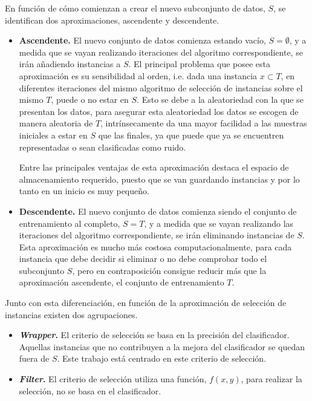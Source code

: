 En función de cómo comienzan a crear el nuevo subconjunto de datos, $S$, se identifican dos aproximaciones, ascendente y descendente.
\begin{itemize}
\item \textbf{Ascendente.} El nuevo conjunto de datos comienza estando vacío, $S = \emptyset$, y a medida que se vayan realizando iteraciones del algoritmo correspondiente, se irán añadiendo instancias a $S$. El principal problema que posee esta aproximación es su sensibilidad al orden, i.e. dada una instancia $x \subset T$, en diferentes iteraciones del mismo algoritmo de selección de instancias sobre el mismo $T$, puede o no estar en $S$. Esto se debe a la aleatoriedad con la que se presentan los datos, para asegurar esta aleatoriedad los datos se escogen de manera aleatoria de $T$, intrínsecamente da una mayor facilidad a las muestras iniciales a estar en $S$ que las finales, ya que puede que ya se encuentren representadas o sean clasificadas como ruido.

Entre las principales ventajas de esta aproximación destaca el espacio de almacenamiento requerido, puesto que se van guardando instancias y por lo tanto en un inicio es muy pequeño.

\item \textbf{Descendente.} El nuevo conjunto de datos comienza siendo el conjunto de entrenamiento al completo, $S = T$, y a medida que se vayan realizando las iteraciones del algoritmo correspondiente, se irán eliminando instancias de $S$. Esta aproximación es mucho más costosa computacionalmente, para cada instancia que debe decidir si eliminar o no debe comprobar todo el subconjunto $S$, pero en contraposición consigue reducir más que la aproximación ascendente, el conjunto de entrenamiento $T$.
\end{itemize}

Junto con esta diferenciación, en función de la aproximación de selección de instancias existen dos agrupaciones.
\begin{itemize}
\item \textbf{\textit{Wrapper}.} El criterio de selección se basa en la precisión del clasificador. Aquellas instancias que no contribuyen a la mejora del clasificador se quedan fuera de $S$. Este trabajo está centrado en este criterio de selección.
\item \textbf{\textit{Filter}.} El criterio de selección utiliza una función, $f(x, y)$, para realizar la selección, no se basa en el clasificador.
\end{itemize}

